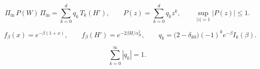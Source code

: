 
\begin{equation}
    \Pi_{\mathrm{in}}\,P(W)\,\Pi_{\mathrm{in}} = \sum_{k=0}^{d} q_k\,T_k(H'),
    \qquad
    P(z) = \sum_{k=0}^{d} q_k z^k,
    \qquad
    \sup_{|z|=1} |P(z)| \le 1 .
    \label{eq:gqsp-block}
\end{equation}


\begin{equation}
    f_\beta(x) = e^{-\beta(1+x)},
    \qquad
    f_\beta(H') = e^{-2\beta H/\alpha_R^2},
    \qquad
    q_k = \bigl(2 - \delta_{k0}\bigr)(-1)^k e^{-\beta} I_k(\beta) .
    \label{eq:qite-filter}
\end{equation}

\begin{proposition}
\label{prop:filter-normalisation}
\begin{equation}
    \sum_{k=0}^{\infty} |q_k| = 1 .
    \label{eq:filter-normalisation}
\end{equation}
\end{proposition}

